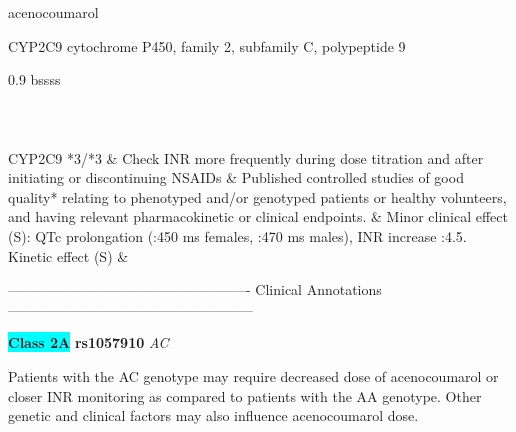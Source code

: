 \documentclass{resume} %
\begin{document}
\begin{rSection}{ acenocoumarol }
\begin{rSubsection}{ CYP2C9 }{ cytochrome P450, family 2, subfamily C, polypeptide 9 }{}{}
\begin{center}
\begin{tabularx}{0.9\textwidth}{ bssss }
\\
		\vspace{1pt}\\
		\hline \\
		\vspace{1pt}\\
		         CYP2C9 *3/*3 & Check INR more frequently during dose titration and after initiating or discontinuing NSAIDs & Published controlled studies of good quality* relating to phenotyped and/or genotyped patients or healthy volunteers, and having relevant pharmacokinetic or clinical endpoints. & Minor clinical effect (S): QTc prolongation (:450 ms females, :470 ms males),  INR increase :4.5. Kinetic effect (S) &
\\
		\end{tabularx}
		\end{center}
		\normalsize
		\vspace{10pt}
		        
\item[] ---------------------------------------------------- Clinical Annotations -----------------------------------------------------\newline
\item \textbf{\colorbox{cyan} {Class 2A}} \textbf{ rs1057910 } \textit{ AC }
\item[] Patients with the AC genotype may require decreased dose of acenocoumarol or closer INR monitoring as compared to patients with the AA genotype. Other genetic and clinical factors may also influence acenocoumarol dose.


\end{rSubsection}
\end{rSection}
\end{document}
